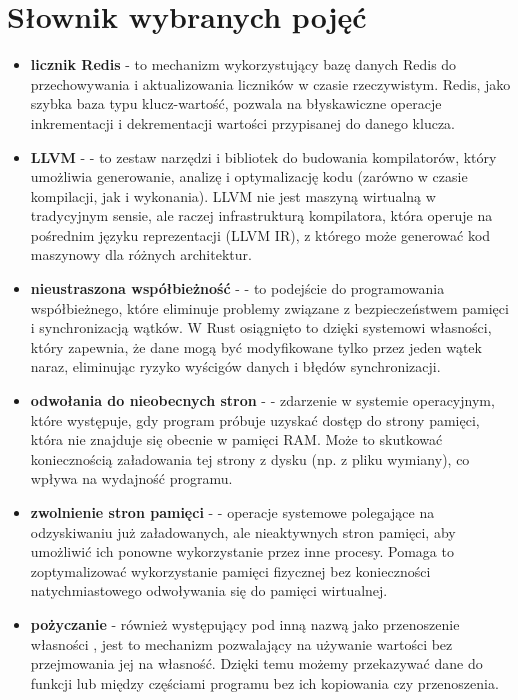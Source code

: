 \section{Słownik wybranych pojęć}

\begin{itemize}
    \item \textbf{licznik Redis} - to mechanizm wykorzystujący bazę danych Redis do przechowywania i aktualizowania liczników w czasie rzeczywistym. Redis, jako szybka baza typu klucz-wartość, pozwala na błyskawiczne operacje inkrementacji i dekrementacji wartości przypisanej do danego klucza.

    \item \textbf{LLVM} -  - to zestaw narzędzi i bibliotek do budowania kompilatorów, który umożliwia generowanie, analizę i optymalizację kodu (zarówno w czasie kompilacji, jak i wykonania). LLVM nie jest maszyną wirtualną w tradycyjnym sensie, ale raczej infrastrukturą kompilatora, która operuje na pośrednim języku reprezentacji (LLVM IR), z którego może generować kod maszynowy dla różnych architektur.

    \item \textbf{nieustraszona współbieżność} -  - to podejście do programowania współbieżnego, które eliminuje problemy związane z bezpieczeństwem pamięci i synchronizacją wątków. W Rust osiągnięto to dzięki systemowi własności, który zapewnia, że dane mogą być modyfikowane tylko przez jeden wątek naraz, eliminując ryzyko wyścigów danych i błędów synchronizacji.

    \item \textbf{odwołania do nieobecnych stron} -  - zdarzenie w systemie operacyjnym, które występuje, gdy program próbuje uzyskać dostęp do strony pamięci, która nie znajduje się obecnie w pamięci RAM. Może to skutkować koniecznością załadowania tej strony z dysku (np. z pliku wymiany), co wpływa na wydajność programu.

    \item \textbf{zwolnienie stron pamięci} -  - operacje systemowe polegające na odzyskiwaniu już załadowanych, ale nieaktywnych stron pamięci, aby umożliwić ich ponowne wykorzystanie przez inne procesy. Pomaga to zoptymalizować wykorzystanie pamięci fizycznej bez konieczności natychmiastowego odwoływania się do pamięci wirtualnej.

    \item \textbf{pożyczanie}  - również występujący pod inną nazwą jako przenoszenie własności \cite{rustPolishNames}, jest to mechanizm pozwalający na używanie wartości bez przejmowania jej na własność. Dzięki temu możemy przekazywać dane do funkcji lub między częściami programu bez ich kopiowania czy przenoszenia.


\end{itemize}
